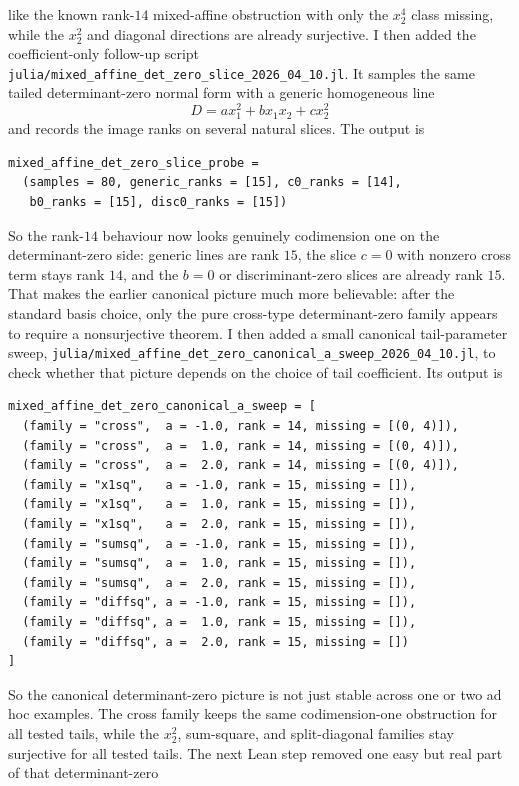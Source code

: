 \documentclass[11pt]{article}
\begin{document}
like the known rank-\(14\) mixed-affine obstruction with only the \(x_2^4\)
class missing, while the \(x_2^2\) and diagonal directions are already
surjective.
I then added the coefficient-only follow-up script
\texttt{julia/mixed\_affine\_det\_zero\_slice\_2026\_04\_10.jl}. It samples the
same tailed determinant-zero normal form with a generic homogeneous line
\[
  D = a x_1^2 + b x_1x_2 + c x_2^2
\]
and records the image ranks on several natural slices. The output is
\begin{verbatim}
mixed_affine_det_zero_slice_probe =
  (samples = 80, generic_ranks = [15], c0_ranks = [14],
   b0_ranks = [15], disc0_ranks = [15])
\end{verbatim}
So the rank-\(14\) behaviour now looks genuinely codimension one on the
determinant-zero side: generic lines are rank \(15\), the slice \(c=0\) with
nonzero cross term stays rank \(14\), and the \(b=0\) or discriminant-zero
slices are already rank \(15\). That makes the earlier canonical picture much
more believable: after the standard basis choice, only the pure cross-type
determinant-zero family appears to require a nonsurjective theorem.
I then added a small canonical tail-parameter sweep,
\texttt{julia/mixed\_affine\_det\_zero\_canonical\_a\_sweep\_2026\_04\_10.jl},
to check whether that picture depends on the choice of tail coefficient.
Its output is
\begin{verbatim}
mixed_affine_det_zero_canonical_a_sweep = [
  (family = "cross",  a = -1.0, rank = 14, missing = [(0, 4)]),
  (family = "cross",  a =  1.0, rank = 14, missing = [(0, 4)]),
  (family = "cross",  a =  2.0, rank = 14, missing = [(0, 4)]),
  (family = "x1sq",   a = -1.0, rank = 15, missing = []),
  (family = "x1sq",   a =  1.0, rank = 15, missing = []),
  (family = "x1sq",   a =  2.0, rank = 15, missing = []),
  (family = "sumsq",  a = -1.0, rank = 15, missing = []),
  (family = "sumsq",  a =  1.0, rank = 15, missing = []),
  (family = "sumsq",  a =  2.0, rank = 15, missing = []),
  (family = "diffsq", a = -1.0, rank = 15, missing = []),
  (family = "diffsq", a =  1.0, rank = 15, missing = []),
  (family = "diffsq", a =  2.0, rank = 15, missing = [])
]
\end{verbatim}
So the canonical determinant-zero picture is not just stable across one or two
ad hoc examples. The cross family keeps the same codimension-one obstruction
for all tested tails, while the \(x_2^2\), sum-square, and split-diagonal
families stay surjective for all tested tails.
The next Lean step removed one easy but real part of that determinant-zero
\end{document}
